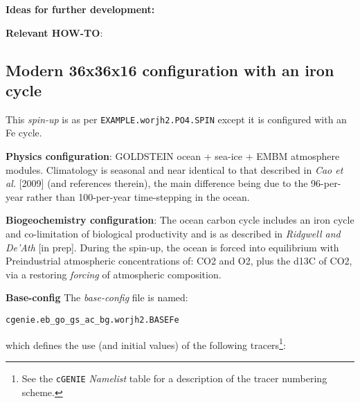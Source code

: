 \documentclass[10pt,twoside]{article}
\begin{document}
\noindent \textbf{Ideas for further development:} 

\noindent \textbf{Relevant HOW-TO}: 


\subsection{Modern 36x36x16 configuration with an iron cycle}\label{EXAMPLE.worjh2.PO4Fe.SPIN}

This \textit{spin-up} is as per \texttt{EXAMPLE.worjh2.PO4.SPIN} except it is configured with an Fe cycle.

\noindent \textbf{Physics configuration}: GOLDSTEIN ocean + sea-ice + EMBM atmosphere modules. Climatology is seasonal and near identical to that described in \textit{Cao et al.} [2009] (and references therein), the main difference being due to the 96-per-year rather than 100-per-year time-stepping in the ocean.

\noindent \textbf{Biogeochemistry configuration}: The ocean carbon cycle includes an iron cycle and co-limitation of biological productivity and is as described in \textit{Ridgwell and De'Ath} [in prep]. During the spin-up, the ocean is forced into equilibrium with Preindustrial atmospheric concentrations of: CO2 and O2, plus the d13C of CO2, via a restoring \textit{forcing} of atmospheric composition.

\noindent \textbf{Base-config} The \textit{base-config} file is named:
\vspace{-10pt}\begin{verbatim}cgenie.eb_go_gs_ac_bg.worjh2.BASEFe\end{verbatim}\vspace{-10pt} which defines the use (and initial values) of the following tracers\footnote{See the \texttt{cGENIE} \textit{Namelist} table for a description of the tracer numbering scheme.}:
\end{document}
